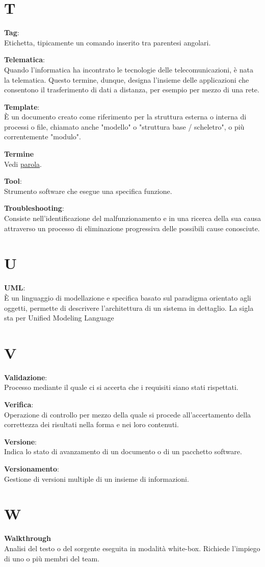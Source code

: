 \documentclass[a4paper, oneside, openany, dvipsnames, table]{article}
\begin{document}
\newpage
\section{T}
\textbf{Tag}:\\	Etichetta, tipicamente un comando inserito tra parentesi angolari.

\textbf{Telematica}:\\ Quando l'informatica ha incontrato le tecnologie delle telecomunicazioni, è nata la telematica. Questo termine, dunque, designa l'insieme delle applicazioni che consentono il trasferimento di dati a distanza, per esempio per mezzo di una rete. 

\textbf{Template}:\\ È un documento creato come riferimento per la struttura esterna o interna di processi o file, chiamato anche "modello" o "struttura base / scheletro", o più correntemente "modulo".

\textbf{Termine}\\
Vedi \hyperref[par:parola]{parola}.

\textbf{Tool}:\\	Strumento software che esegue una specifica funzione.

\textbf{Troubleshooting}:\\	Consiste nell'identificazione del malfunzionamento e in una ricerca della sua causa attraverso un processo di eliminazione progressiva delle possibili cause conosciute.

\newpage 
\section{U}

\textbf{UML}:\\ È un linguaggio di modellazione e specifica basato sul paradigma orientato agli oggetti, permette di descrivere l'architettura di un sistema in dettaglio. La sigla sta per Unified Modeling Language

\newpage
\section{V}
\textbf{Validazione}:\\	Processo mediante il quale ci si accerta che i requisiti siano stati rispettati.

\textbf{Verifica}:\\	Operazione di controllo per mezzo della quale si procede all'accertamento della correttezza dei risultati nella forma e nei loro contenuti.

\textbf{Versione}:\\ Indica lo stato di avanzamento di un documento o di un pacchetto software.

\textbf{Versionamento}:\\	Gestione di versioni multiple di un insieme di informazioni.

\newpage
\section{W}
\textbf{Walkthrough}\\
Analisi del testo o del sorgente eseguita in modalità white-box. Richiede l'impiego di uno o più membri del team.
\end{document}
